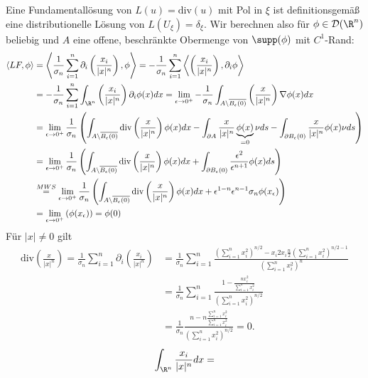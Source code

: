 \begin{solution}
Eine Fundamentallösung von $L(u) = \mathrm{div}(u)$ mit Pol in $\xi$ ist definitionsgemäß
eine distributionelle Lösung von $L(U_{\xi}) = \delta_{\xi}$. Wir berechnen also
für $\phi \in \mathcal{D}(\R^n)$ beliebig und $A$ eine offene, beschränkte Obermenge
von $\supp(\phi)$ mit $C^1$-Rand:
\begin{align*}
  \langle L F, \phi \rangle
  &= \left\langle \frac{1}{\sigma_n}\sum_{i = 1}^n\partial_i\left(\frac{x_i}{|x|^n}\right), \phi \right\rangle
  = -\frac{1}{\sigma_n}\sum_{i = 1}^n\left\langle \left(\frac{x_i}{|x|^n}\right), \partial_i\phi \right\rangle \\
  &= -\frac{1}{\sigma_n}\sum_{i = 1}^n\int_{\R^n}\left(\frac{x_i}{|x|^n}\right)\partial_i\phi(x)dx
  = \lim_{\epsilon \to 0^+}-\frac{1}{\sigma_n}\int_{A\backslash\overline{B_{\epsilon}(0)}}
  \left(\frac{x}{|x|^n}\right)\nabla \phi(x)dx \\
  &= \lim_{\epsilon \to 0^+}\frac{1}{\sigma_n}\left(\int_{A\backslash\overline{B_{\epsilon}(0)}}\mathrm{div}\left(\frac{x}{|x|^n}\right) \phi(x)dx
  - \int_{\partial A}\frac{x}{|x|^n}\underbrace{\phi(x)}_{=0}\nu ds
  - \int_{\partial B_{\epsilon}(0)}\frac{x}{|x|^n}\phi(x)\nu ds\right) \\
  &= \lim_{\epsilon \to 0^+}\frac{1}{\sigma_n}\left(\int_{A\backslash\overline{B_{\epsilon}(0)}}\mathrm{div}\left(\frac{x}{|x|^n}\right) \phi(x)dx
  + \int_{\partial B_{\epsilon}(0)}\frac{\epsilon^2}{\epsilon^{n+1}}\phi(x) ds\right) \\
  &\stackrel{MWS}{=} \lim_{\epsilon \to 0^+}\frac{1}{\sigma_n}\left(\int_{A\backslash\overline{B_{\epsilon}(0)}}\mathrm{div}\left(\frac{x}{|x|^n}\right) \phi(x)dx
  + \epsilon^{1-n}\epsilon^{n-1}\sigma_n\phi(x_{\epsilon})\right) \\
  &= \lim_{\epsilon \to 0^+}\left(\phi(x_{\epsilon})\right) = \phi(0)\\
\end{align*}
Für $|x| \neq 0$ gilt
\begin{align*}
  \mathrm{div}\left(\frac{x}{|x|^n}\right)
  =\frac{1}{\sigma_n}\sum_{i=1}^n\partial_i\left(\frac{x_i}{|x|^n}\right)
  &= \frac{1}{\sigma_n}\sum_{i=1}^n\frac{\left(\sum_{i=1}^nx_i^2\right)^{n/2} - x_i2x_i\frac{n}{2}\left(\sum_{i=1}^nx_i^2\right)^{n/2 - 1}}{\left(\sum_{i=1}^nx_i^2\right)^n} \\
  &= \frac{1}{\sigma_n}\sum_{i=1}^n\frac{1 - \frac{nx_i^2}{\sum_{i=1}^nx_i^2}}{\left(\sum_{i=1}^nx_i^2\right)^{n/2}} \\
  &= \frac{1}{\sigma_n}\frac{n - n\frac{\sum_{i=1}^nx_i^2}{\sum_{i=1}^nx_i^2}}{\left(\sum_{i=1}^nx_i^2\right)^{n/2}} = 0.
\end{align*}
\begin{align*}
  \int_{\R^n}\frac{x_i}{|x|^n} dx = 
\end{align*}
\end{solution}

